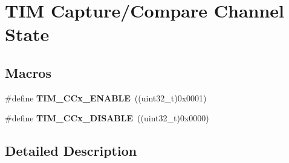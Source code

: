 \hypertarget{group___t_i_m___channel___c_c___state}{\section{T\-I\-M Capture/\-Compare Channel State}
\label{group___t_i_m___channel___c_c___state}
}
\subsection*{Macros}
\begin{DoxyCompactItemize}
\item 
\hypertarget{group___t_i_m___channel___c_c___state_ga7b214df0d5c67138de7bc84e937909f0}{\#define {\bfseries T\-I\-M\-\_\-\-C\-Cx\-\_\-\-E\-N\-A\-B\-L\-E}~((uint32\-\_\-t)0x0001)}\label{group___t_i_m___channel___c_c___state_ga7b214df0d5c67138de7bc84e937909f0}

\item 
\hypertarget{group___t_i_m___channel___c_c___state_ga5068d16e01778cd3bd09555013b2f4d3}{\#define {\bfseries T\-I\-M\-\_\-\-C\-Cx\-\_\-\-D\-I\-S\-A\-B\-L\-E}~((uint32\-\_\-t)0x0000)}\label{group___t_i_m___channel___c_c___state_ga5068d16e01778cd3bd09555013b2f4d3}

\end{DoxyCompactItemize}


\subsection{Detailed Description}

